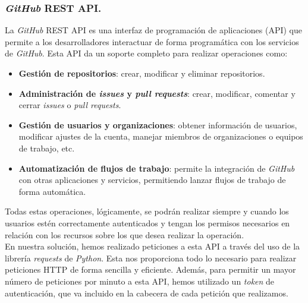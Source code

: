 \subsubsection{\textit{GitHub} REST API.}
La \textit{GitHub} REST API \cite{20} es una interfaz de programación de aplicaciones (API) que permite a
los desarrolladores interactuar de forma programática con los servicios de \textit{GitHub}. Esta
API da un soporte completo para realizar operaciones como:

\begin{itemize}
	\item \textbf{Gestión de repositorios}: crear, modificar y eliminar repositorios.\\
	\item \textbf{Administración de \textit{issues} y \textit{pull requests}}: crear, modificar, comentar
    y cerrar \textit{issues} o \textit{pull requests}.\\
	\item \textbf{Gestión de usuarios y organizaciones}: obtener información de usuarios, modificar
    ajustes de la cuenta, manejar miembros de organizaciones o 	equipos de trabajo, etc.\\
	\item \textbf{Automatización de flujos de trabajo}: permite la integración de \textit{GitHub} con otras
    aplicaciones y servicios, permitiendo lanzar flujos de trabajo de forma automática.
\end{itemize}


Todas estas operaciones, lógicamente, se podrán realizar siempre y cuando los usuarios estén
correctamente autenticados y tengan los permisos necesarios en relación con los recursos sobre los
que desea realizar la operación.\\

En nuestra solución, hemos realizado peticiones a esta API a través del uso de la librería
\textit{requests} de \textit{Python}. Esta nos proporciona todo lo necesario para realizar
peticiones HTTP de forma sencilla y eficiente. Además, para permitir un mayor número de peticiones
por minuto a esta API, hemos utilizado un \textit{token} de autenticación, que va incluido en la
cabecera de cada petición que realizamos.\\


